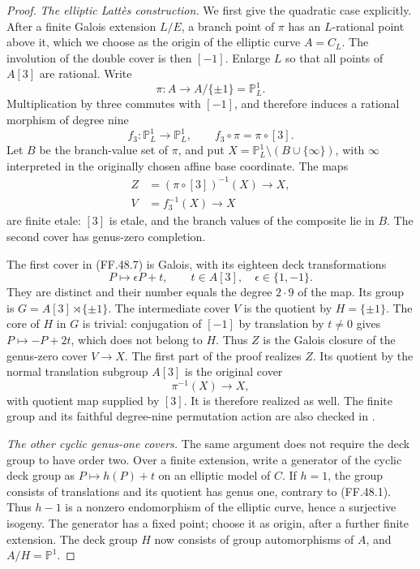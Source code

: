\begin{proof}
\emph{The elliptic Latt\`es construction.}
We first give the quadratic case explicitly. After a
finite Galois extension \(L/E\), a branch point of
\(\pi\) has an \(L\)-rational point above it, which
we choose as the origin of the elliptic curve \(A=C_L\).
The involution of the double cover is then \([-1]\).
Enlarge \(L\) so that all points of \(A[3]\) are
rational. Write
\[
                 \pi:A\longrightarrow A/\{\pm1\}
                                      =\mathbb P^1_L.
\]
Multiplication by three commutes with \([-1]\), and
therefore induces a rational morphism of degree nine
\[
          f_3:\mathbb P^1_L\longrightarrow\mathbb P^1_L,
                 \qquad f_3\circ\pi=\pi\circ[3].
                                                        \tag{FF.48.6}
\]
Let \(B\) be the branch-value set of \(\pi\), and
put \(X=\mathbb P^1_L\setminus(B\cup\{\infty\})\),
with \(\infty\) interpreted in the originally chosen
affine base coordinate. The maps
\[
 \begin{split}
  Z&=(\pi\circ[3])^{-1}(X)\longrightarrow X,\\
  V&=f_3^{-1}(X)\longrightarrow X
 \end{split}
                                                        \tag{FF.48.7}
\]
are finite etale: \([3]\) is etale, and the branch
values of the composite lie in \(B\). The second
cover has genus-zero completion.

The first cover in (FF.48.7) is Galois, with its
eighteen deck transformations
\[
            P\longmapsto \epsilon P+t,
             \qquad t\in A[3],\quad\epsilon\in\{1,-1\}.
                                                        \tag{FF.48.8}
\]
They are distinct and their number equals the degree
\(2\cdot9\) of the map. Its group is
\(G=A[3]\rtimes\{\pm1\}\). The intermediate
cover \(V\) is the quotient by
\(H=\{\pm1\}\). The core of \(H\) in \(G\)
is trivial: conjugation of \([-1]\) by translation
by \(t\ne0\) gives \(P\mapsto-P+2t\), which
does not belong to \(H\). Thus \(Z\) is the
Galois closure of the genus-zero cover \(V\to X\).
The first part of the proof realizes \(Z\).
Its quotient by the normal translation subgroup
\(A[3]\) is the original cover
\[
               \pi^{-1}(X)\longrightarrow X,
                                                        \tag{FF.48.9}
\]
with quotient map supplied by \([3]\). It is therefore
realized as well. The finite group and its faithful
degree-nine permutation action are also checked in
.

\emph{The other cyclic genus-one covers.}
The same argument does not require the deck group to
have order two. Over a finite extension, write a
generator of the cyclic deck group as
\(P\mapsto h(P)+t\) on an elliptic model of \(C\).
If \(h=1\), the group consists of translations and
its quotient has genus one, contrary to (FF.48.1).
Thus \(h-1\) is a nonzero endomorphism of the elliptic
curve, hence a surjective isogeny. The generator has
a fixed point; choose it as origin, after a further
finite extension. The deck group \(H\) now consists
of group automorphisms of \(A\), and
\(A/H=\mathbb P^1\).


\end{proof}
